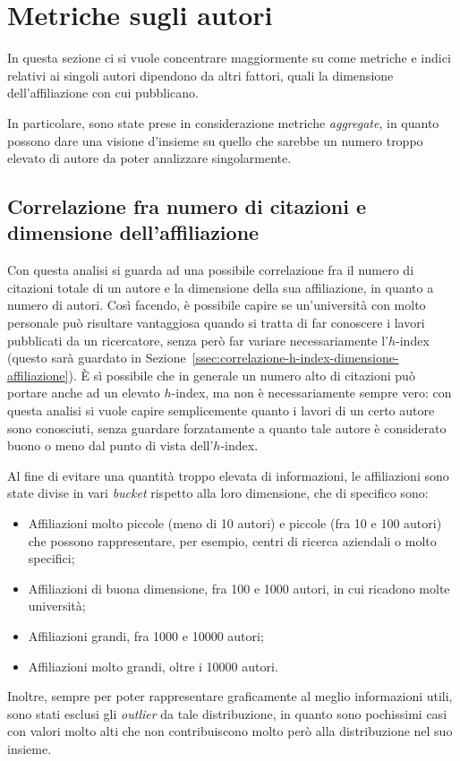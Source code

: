 \section{Metriche sugli autori}

In questa sezione ci si vuole concentrare maggiormente su come metriche e
indici relativi ai singoli autori dipendono da altri fattori, quali la
dimensione dell'affiliazione con cui pubblicano.

In particolare, sono state prese in considerazione metriche \textit{aggregate},
in quanto possono dare una visione d'insieme su quello che sarebbe un numero
troppo elevato di autore da poter analizzare singolarmente.

\subsection{Correlazione fra numero di citazioni e dimensione dell'affiliazione}
\label{ssec:correlazione-citazioni-dimensione-affiliazione}

Con questa analisi si guarda ad una possibile correlazione fra il numero di
citazioni totale di un autore e la dimensione della sua affiliazione, in
quanto a numero di autori.
Così facendo, è possibile capire se un'università con molto personale
può risultare vantaggiosa quando si tratta di far conoscere i lavori pubblicati
da un ricercatore, senza però far variare necessariamente l'$h$-index (questo
sarà guardato in Sezione~\ref{ssec:correlazione-h-index-dimensione-affiliazione}).
È sì possibile che in generale un numero alto di citazioni può portare anche ad
un elevato $h$-index, ma non è necessariamente sempre vero: con questa analisi
si vuole capire semplicemente quanto i lavori di un certo autore sono conosciuti,
senza guardare forzatamente a quanto tale autore è considerato buono o meno
dal punto di vista dell'$h$-index.

Al fine di evitare una quantità troppo elevata di informazioni, le affiliazioni
sono state divise in vari \textit{bucket} rispetto alla loro dimensione, che
di specifico sono:
\begin{itemize}
  \item Affiliazioni molto piccole (meno di 10 autori) e piccole (fra 10 e
        100 autori) che possono rappresentare, per esempio, centri di ricerca
        aziendali o molto specifici;
  \item Affiliazioni di buona dimensione, fra 100 e 1000 autori, in cui
        ricadono molte università;
  \item Affiliazioni grandi, fra 1000 e 10000 autori;
  \item Affiliazioni molto grandi, oltre i 10000 autori.
\end{itemize}
%
Inoltre, sempre per poter rappresentare graficamente al meglio informazioni
utili, sono stati esclusi gli \textit{outlier} da tale distribuzione, in quanto
sono pochissimi casi con valori molto alti che non contribuiscono molto però
alla distribuzione nel suo insieme.

